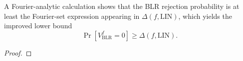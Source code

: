 \begin{theorem}
\label{lem:fourier-analytic-lower-bound}
\leanok
A Fourier-analytic calculation shows that the BLR rejection
  probability is at least the Fourier-set expression appearing in
  $\Delta(f,\mathrm{LIN})$, which yields the improved lower bound
  \[
    \Pr[V^{f}_{\mathrm{BLR}} = 0] \ge \Delta(f,\mathrm{LIN}).
  \]
\end{theorem}
\begin{proof}
\end{proof}
